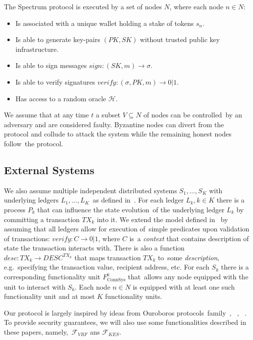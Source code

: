 The Spectrum protocol is executed by a set of nodes $N$, where each node $n \in N$:
\begin{itemize}
    \item Is associated with a unique wallet holding a stake of tokens $s_n$.
    \item Is able to generate key-pairs ${(PK, SK)}$ without trusted public key infrastructure.
    \item Is able to sign messages ${sign: (SK, m) \rightarrow \sigma}$.
    \item Is able to verify signatures ${verify: (\sigma, PK, m) \rightarrow 0 | 1}$.
    \item Has access to a random oracle $\mathcal{H}$.
\end{itemize}

We assume that at any time $t$ a subset ${V \subseteq N}$ of nodes can be controlled\
by an adversary and are considered faulty.
Byzantine nodes can divert from the protocol and collude to attack the system while the remaining honest nodes follow\
the protocol.

\subsection{External Systems}\label{subsec:external-systems.}
We also assume multiple independent distributed systems ${S_1, \dots, S_K}$ with underlying ledgers ${L_1, \dots, L_K}$\
as defined in~\cite{cryptoeprint:2019/1128}.
For each ledger ${L_k, k \in K}$ there is a process $P_k$ that can influence the state evolution\
of the underlying ledger $L_k$ by committing a transaction $TX_k$ into it.
We extend the model defined in~\cite{cryptoeprint:2019/1128} by assuming that all ledgers allow for execution of\
simple predicates upon validation of transactions: ${verify: C \rightarrow 0 | 1}$, where $C$ is\
a \emph{context} that contains description of state the transaction interacts with.
There is also a function ${desc: TX_k \rightarrow DESC^{TX_k}}$ that maps transaction $TX_k$ to\
some \emph{description}, e.g.\ specifying the transaction value, recipient address, etc.
For each $S_k$ there is a corresponding functionality unit $F^k_{\text{ConnSys}}$ that\
allows any node equipped with the unit to interact with $S_k$.
Each node $n \in N$ is equipped with at least one such functionality unit and at most $K$ functionality units.

Our protocol is largely inspired by ideas from Ouroboros protocols\
family~\cite{cryptoeprint:2017/573}, ~\cite{Badertscher2018}, ~\cite{cryptoeprint:2019/838}.
To provide security guarantees, we will also use some functionalities described in these papers, namely,\
${\mathcal{F}}_{VRF}$ ans ${\mathcal{F}}_{KES}$.